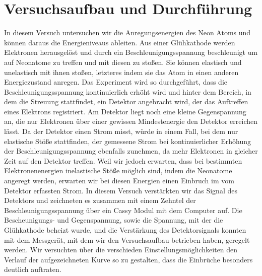 \documentclass[a4paper, 12pt]{scrartcl}
\begin{document}
\section{Versuchsaufbau und Durchführung}
In diesem Versuch untersuchen wir die Anregungsenergien des Neon Atoms und können daraus die Energieniveaus ableiten. Aus einer Glühkathode werden Elektronen herausgelöst und durch ein Beschleunigungsspannung beschleunigt um auf Neonatome zu treffen und mit diesen zu stoßen. Sie können elastisch und unelastisch mit ihnen stoßen, letzteres indem sie das Atom in einen anderen Energiezustand anregen. Das Experiment wird so durchgeführt, dass die Beschleunigungsspannung kontinuierlich erhöht wird und hinter dem Bereich, in dem die Streuung stattfindet, ein Detektor angebracht wird, der das Auftreffen eines Elektrons registriert. Am Detektor liegt noch eine kleine Gegenspannung an, die nur Elektronen über einer gewissen Mindestenergie den Detektor erreichen lässt. Da der Detektor einen Strom misst, würde in einem Fall, bei dem nur elastische Stöße stattfinden, der gemessene Strom bei kontinuierlicher Erhöhung der Beschleunigungsspannung ebenfalls zunehmen, da mehr Elektronen in gleicher Zeit auf den Detektor treffen. Weil wir jedoch erwarten, dass bei bestimmten Elektronenenergien inelastische Stöße möglich sind, indem die Neonatome angeregt werden, erwarten wir bei diesen Energien einen Einbruch im vom Detektor erfassten Strom.
In diesem Versuch verstärkten wir das Signal des Detektors und zeichneten es zusammen mit einem Zehntel der Beschleunigungsspannung über ein Cassy Modul mit dem Computer auf. Die Bescheunigungs- und Gegenspannung, sowie die Spannung, mit der die Glühkathode beheizt wurde, und die Verstärkung des Detektorsignals konnten mit dem Messgerät, mit dem wir den Versuchsaufbau betrieben haben, geregelt werden. Wir versuchten über die verschieden Einstellungsmöglichkeiten den Verlauf der aufgezeichneten Kurve so zu gestalten, dass die Einbrüche besonders deutlich auftraten.
\newpage
\end{document}
